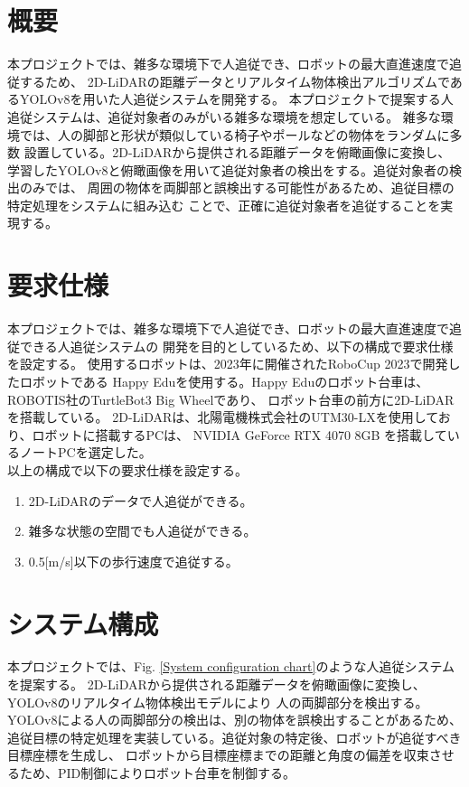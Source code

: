 \section{概要}
本プロジェクトでは、雑多な環境下で人追従でき、ロボットの最大直進速度で追従するため、
2D-LiDARの距離データとリアルタイム物体検出アルゴリズムであるYOLOv8を用いた人追従システムを開発する。
本プロジェクトで提案する人追従システムは、追従対象者のみがいる雑多な環境を想定している。
雑多な環境では、人の脚部と形状が類似している椅子やポールなどの物体をランダムに多数
設置している。2D-LiDARから提供される距離データを俯瞰画像に変換し、
学習したYOLOv8と俯瞰画像を用いて追従対象者の検出をする。追従対象者の検出のみでは、
周囲の物体を両脚部と誤検出する可能性があるため、追従目標の特定処理をシステムに組み込む
ことで、正確に追従対象者を追従することを実現する。

\section{要求仕様}
本プロジェクトでは、雑多な環境下で人追従でき、ロボットの最大直進速度で追従できる人追従システムの
開発を目的としているため、以下の構成で要求仕様を設定する。
使用するロボットは、2023年に開催されたRoboCup 2023で開発したロボットである
Happy Eduを使用する。Happy Eduのロボット台車は、ROBOTIS社のTurtleBot3 Big Wheelであり、
ロボット台車の前方に2D-LiDARを搭載している。
2D-LiDARは、北陽電機株式会社のUTM30-LXを使用しており、ロボットに搭載するPCは、
NVIDIA GeForce RTX 4070 8GB を搭載しているノートPCを選定した。\\ \indent
以上の構成で以下の要求仕様を設定する。\\

\begin{enumerate}
\item 2D-LiDARのデータで人追従ができる。
\item 雑多な状態の空間でも人追従ができる。
\item 0.5[m/s]以下の歩行速度で追従する。
\end{enumerate}

\section{システム構成}
本プロジェクトでは、Fig. \ref{System configuration chart}のような人追従システムを提案する。
2D-LiDARから提供される距離データを俯瞰画像に変換し、YOLOv8のリアルタイム物体検出モデルにより
人の両脚部分を検出する。YOLOv8による人の両脚部分の検出は、別の物体を誤検出することがあるため、
追従目標の特定処理を実装している。追従対象の特定後、ロボットが追従すべき目標座標を生成し、
ロボットから目標座標までの距離と角度の偏差を収束させるため、PID制御によりロボット台車を制御する。

